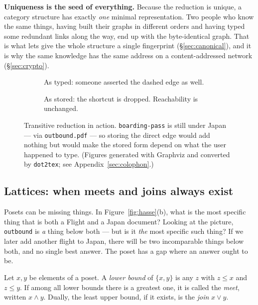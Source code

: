\begin{keyidea}
\textbf{Uniqueness is the seed of everything.} Because the reduction is
unique, a category structure has exactly \emph{one} minimal representation.
Two people who know the same things, having built their graphs in different
orders and having typed some redundant links along the way, end up with the
byte-identical graph. That is what lets \odag{} give the whole structure a
single fingerprint (\S\ref{sec:canonical}), and it is why the same knowledge
has the same address on a content-addressed network
(\S\ref{sec:crypto}).
\end{keyidea}

\begin{figure}[t]
\centering
\begin{subfigure}[b]{0.48\textwidth}\centering
  \caption{As typed: someone asserted the dashed edge as well.}
\end{subfigure}\hfill
\begin{subfigure}[b]{0.48\textwidth}\centering
  \caption{As stored: the shortcut is dropped. Reachability is unchanged.}
\end{subfigure}
\caption{Transitive reduction in action. \texttt{boarding-pass} is still under
\textsf{Japan} --- via \texttt{outbound.pdf} --- so storing the direct edge
would add nothing but would make the stored form depend on what the user
happened to type. (Figures generated with Graphviz and converted by
\texttt{dot2tex}; see Appendix~\ref{sec:colophon}.)}
\label{fig:reduction}
\end{figure}

\subsection{Lattices: when meets and joins always exist}

Posets can be missing things. In Figure~\ref{fig:hasse}(b), what is the most
specific thing that is both a \textsf{Flight} and a \textsf{Japan} document?
Looking at the picture, \texttt{outbound} is \emph{a} thing below both --- but
is it \emph{the} most specific such thing? If we later add another flight to
Japan, there will be two incomparable things below both, and no single
best answer. The poset has a gap where an answer ought to be.

\begin{definition}
Let $x, y$ be elements of a poset. A \emph{lower bound} of $\{x,y\}$ is any
$z$ with $z \leq x$ and $z \leq y$. If among all lower bounds there is a
greatest one, it is called the \emph{meet}, written $x \wedge y$. Dually, the
least upper bound, if it exists, is the \emph{join} $x \vee y$.
\end{definition}

